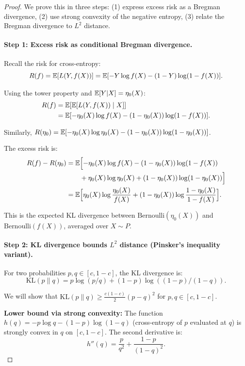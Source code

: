 \documentclass[12pt]{article}
\begin{document}
\begin{proof}
We prove this in three steps: (1) express excess risk as a Bregman divergence, (2) use strong convexity of the negative entropy, (3) relate the Bregman divergence to $L^2$ distance.

\paragraph{Step 1: Excess risk as conditional Bregman divergence.}

Recall the risk for cross-entropy:
\[
R(f) = \mathbb{E}[L(Y, f(X))] = \mathbb{E}[-Y \log f(X) - (1-Y) \log(1-f(X))].
\]

Using the tower property and $\mathbb{E}[Y|X] = \eta_0(X)$:
\begin{align*}
R(f)
&= \mathbb{E}[\mathbb{E}[L(Y, f(X)) \mid X]] \\
&= \mathbb{E}[-\eta_0(X) \log f(X) - (1-\eta_0(X)) \log(1-f(X))].
\end{align*}

Similarly, $R(\eta_0) = \mathbb{E}[-\eta_0(X) \log \eta_0(X) - (1-\eta_0(X)) \log(1-\eta_0(X))]$.

The excess risk is:
\begin{align}
R(f) - R(\eta_0)
&= \mathbb{E}\Bigl[ -\eta_0(X) \log f(X) - (1-\eta_0(X)) \log(1-f(X)) \nonumber \\
&\quad\quad + \eta_0(X) \log \eta_0(X) + (1-\eta_0(X)) \log(1-\eta_0(X)) \Bigr] \nonumber \\
&= \mathbb{E}\Bigl[ \eta_0(X) \log \frac{\eta_0(X)}{f(X)} + (1-\eta_0(X)) \log \frac{1-\eta_0(X)}{1-f(X)} \Bigr]. \label{eq:kl-divergence}
\end{align}

This is the expected KL divergence between $\text{Bernoulli}(\eta_0(X))$ and $\text{Bernoulli}(f(X))$, averaged over $X \sim P$.

\paragraph{Step 2: KL divergence bounds $L^2$ distance (Pinsker's inequality variant).}

For two probabilities $p, q \in [c, 1-c]$, the KL divergence is:
\[
\text{KL}(p \| q) = p \log(p/q) + (1-p) \log((1-p)/(1-q)).
\]

We will show that $\text{KL}(p \| q) \ge \frac{c(1-c)}{2} (p - q)^2$ for $p, q \in [c, 1-c]$.

\textbf{Lower bound via strong convexity:}
The function $h(q) = -p \log q - (1-p) \log(1-q)$ (cross-entropy of $p$ evaluated at $q$) is strongly convex in $q$ on $[c, 1-c]$. The second derivative is:
\[
h''(q) = \frac{p}{q^2} + \frac{1-p}{(1-q)^2}.
\]


\end{proof}
\end{document}
